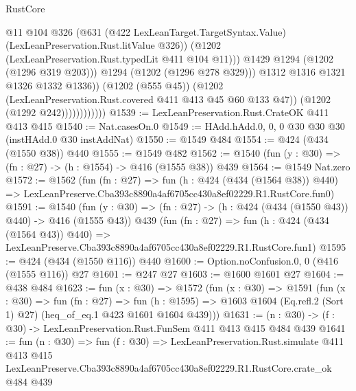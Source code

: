 \begin{lexlean}{RustCore}
\begin{coremodule}
                                  @11
                                  @104
                                  @326
                                  (@631
                                    (@422 LexLeanTarget.TargetSyntax.Value)
                                    (LexLeanPreservation.Rust.litValue @326))
                                  (@1202 (LexLeanPreservation.Rust.typedLit @411 @104 @11)))
                                @1429
                                @1294
                                (@1202 (@1296 @319 @203)))
                              @1294
                              (@1202 (@1296 @278 @329)))
                            @1312
                            @1316
                            @1321
                            @1326
                            @1332
                            @1336))
                        (@1202 (@555 @45))
                        (@1202 (LexLeanPreservation.Rust.covered @411 @413 @45 @60 @133 @47))
                        (@1202 (@1292 @242))))))))))))
@1539 := LexLeanPreservation.Rust.CrateOK @411 @413 @415
@1540 := Nat.casesOn.{0}
@1549 := HAdd.hAdd.{0, 0, 0} @30 @30 @30 (instHAdd.{0} @30 instAddNat)
@1550 := @1549 @484
@1554 := @424 (@434 (@1550 @38)) @440
@1555 := @1549 @482
@1562 := @1540 (fun (y : @30) => (fn : @27) -> (h : @1554) -> @416 (@1555 @38)) @439
@1564 := @1549 Nat.zero
@1572 := @1562
    (fun (fn : @27) =>
    fun (h : @424 (@434 (@1564 @38)) @440) =>
    LexLeanPreserve.Cba393c8890a4af6705cc430a8ef02229.R1.RustCore.fun0)
@1591 := @1540
    (fun (y : @30) => (fn : @27) -> (h : @424 (@434 (@1550 @43)) @440) -> @416 (@1555 @43))
    @439
    (fun (fn : @27) =>
    fun (h : @424 (@434 (@1564 @43)) @440) =>
    LexLeanPreserve.Cba393c8890a4af6705cc430a8ef02229.R1.RustCore.fun1)
@1595 := @424 (@434 (@1550 @116)) @440
@1600 := Option.noConfusion.{0, 0} (@416 (@1555 @116)) @27
@1601 := @247 @27
@1603 := @1600 @1601 @27
@1604 := @438 @484
@1623 := fun (x : @30) =>
  @1572
    (fun (x : @30) =>
    @1591
      (fun (x : @30) =>
      fun (fn : @27) =>
      fun (h : @1595) =>
      @1603 @1604 (Eq.refl.{2} (Sort 1) @27) (heq_of_eq.{1} @423 @1601 @1604 @439)))
@1631 := (n : @30) -> (f : @30) -> LexLeanPreservation.Rust.FunSem @411 @413 @415 @484 @439
@1641 := fun (n : @30) =>
  fun (f : @30) =>
  LexLeanPreservation.Rust.simulate
    @411
    @413
    @415
    LexLeanPreserve.Cba393c8890a4af6705cc430a8ef02229.R1.RustCore.crate_ok
    @484
    @439
\end{coremodule}
\end{lexlean}
